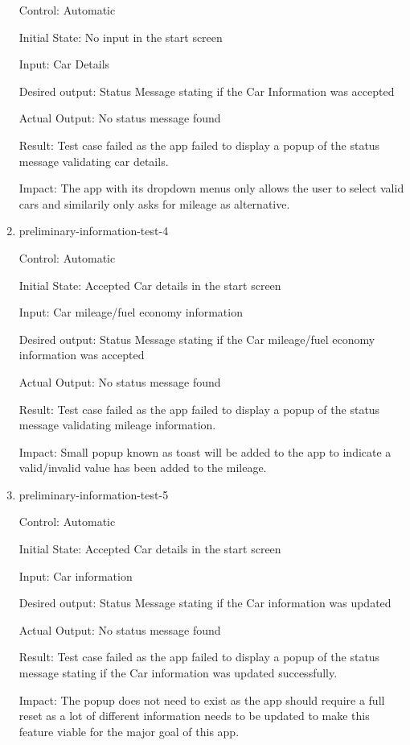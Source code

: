 \documentclass[12pt, titlepage]{article}
\begin{document}
\begin{enumerate}
Control: Automatic
					
Initial State: No input in the start screen
					
Input: Car Details

Desired output: Status Message stating if the Car Information was accepted

Actual Output: No status message found

Result: Test case failed as the app failed to display a popup of the status message validating car details.

Impact: The app with its dropdown menus only allows the user to select valid cars and similarily only asks for 
mileage as alternative.

\item{preliminary-information-test-4\\}

Control: Automatic
					
Initial State: Accepted Car details in the start screen
					
Input: Car mileage/fuel economy information

Desired output: Status Message stating if the Car mileage/fuel economy information was accepted

Actual Output: No status message found

Result: Test case failed as the app failed to display a popup of the status message validating mileage information.

Impact: Small popup known as toast will be added to the app to indicate a valid/invalid value has been added to the mileage.

\item{preliminary-information-test-5\\}

Control: Automatic
					
Initial State: Accepted Car details in the start screen
					
Input: Car information

Desired output: Status Message stating if the Car information was updated

Actual Output: No status message found

Result: Test case failed as the app failed to display a popup of the status message stating if the Car information was updated successfully.

Impact: The popup does not need to exist as the app should require a full reset as a lot of different information needs to be 
updated to make this feature viable for the major goal of this app.

\end{enumerate}
\end{document}

